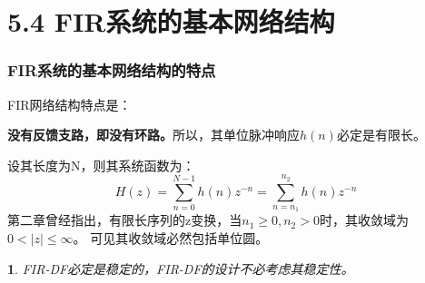 \documentclass[notheorems,compress,mathserif,table]{beamer}
\newtheorem{dablock}{}
\begin{document}
\section{5.4 FIR系统的基本网络结构}
\begin{frame}\frametitle{FIR系统的基本网络结构的特点}%

FIR网络结构特点是：\par

\textbf{没有反馈支路，即没有环路。}所以，其单位脉冲响应$h(n)$必定是有限长。
\newline

设其长度为N，则其系统函数为：
$$H(z) = \sum_{n=0}^{N-1}h(n)z^{-n}=\sum_{n=n_1}^{n_2}h(n)z^{-n}$$
第二章曾经指出，有限长序列的z变换，当$n_1\geq0,n_2>0$时，其收敛域为$0<|z|\leq\infty$。
可见其收敛域必然包括单位圆。
\newline
\pause
\begin{dablock}
 FIR-DF必定是稳定的，FIR-DF的设计不必考虑其稳定性。
\end{dablock}
\end{frame}
\end{document}

